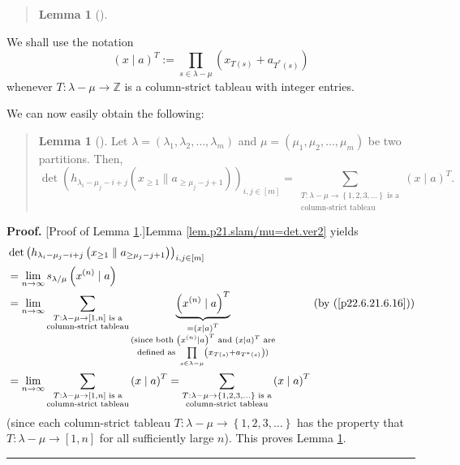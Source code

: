 \documentclass[numbers=enddot,12pt,final,onecolumn,notitlepage]{scrartcl}%
\newenvironment{statement}{\begin{quote}}{\end{quote}}
\theoremstyle{definition}
\newtheorem{lem}[theo]{Lemma}
\newenvironment{lemmain}[1][]
{\begin{statement}\begin{lem}[#1]}
{\end{lem}\end{statement}}
\newenvironment{proof}[1][Proof]{\noindent\textbf{#1.} }{\ \rule{0.5em}{0.5em}}
\newenvironment{lemmain}[1][Proof]{\noindent\textbf{#1.} }{\ \rule{0.5em}{0.5em}}
\let\sumnonlimits\sum
\let\prodnonlimits\prod
\renewcommand{\sum}{\sumnonlimits\limits}
\renewcommand{\prod}{\prodnonlimits\limits}
\begin{document}
\begin{enumerate}
\begin{lemmain}
\end{lemmain}

We shall use the notation%
\[
\left(  x\mid a\right)  ^{T}:=\prod_{s\in\lambda-\mu}\left(  x_{T\left(
s\right)  }+a_{T^{\ast}\left(  s\right)  }\right)
\]
whenever $T:\lambda-\mu\rightarrow\mathbb{Z}$ is a column-strict tableau with
integer entries.

We can now easily obtain the following:

\begin{lemmain}
\label{lem.p21.slam/mu=tab}Let $\lambda=\left(  \lambda_{1},\lambda_{2}%
,\ldots,\lambda_{m}\right)  $ and $\mu=\left(  \mu_{1},\mu_{2},\ldots,\mu
_{m}\right)  $ be two partitions. Then,%
\[
\det\left(  h_{\lambda_{i}-\mu_{j}-i+j}\left(  x_{\geq1}\parallel a_{\geq
\mu_{j}-j+1}\right)  \right)  _{i,j\in\left[  m\right]  }=\sum
_{\substack{T:\lambda-\mu\rightarrow\left\{  1,2,3,\ldots\right\}  \text{ is
a}\\\text{column-strict tableau}}}\left(  x\mid a\right)  ^{T}.
\]

\end{lemmain}

\begin{proof}
[Proof of Lemma \ref{lem.p21.slam/mu=tab}.]Lemma
\ref{lem.p21.slam/mu=det.ver2} yields%
\begin{align*}
&  \det\left(  h_{\lambda_{i}-\mu_{j}-i+j}\left(  x_{\geq1}\parallel
a_{\geq\mu_{j}-j+1}\right)  \right)  _{i,j\in\left[  m\right]  }\\
&  =\lim\limits_{n\rightarrow\infty}s_{\lambda/\mu}\left(  x^{\left(
n\right)  }\mid a\right) \\
&  =\lim\limits_{n\rightarrow\infty}\sum_{\substack{T:\lambda-\mu
\rightarrow\left[  1,n\right]  \text{ is a}\\\text{column-strict tableau}%
}}\underbrace{\left(  x^{\left(  n\right)  }\mid a\right)  ^{T}}%
_{\substack{=\left(  x\mid a\right)  ^{T}\\\text{(since both }\left(
x^{\left(  n\right)  }\mid a\right)  ^{T}\text{ and }\left(  x\mid a\right)
^{T}\text{ are}\\\text{defined as }\prod_{s\in\lambda-\mu}\left(  x_{T\left(
s\right)  }+a_{T^{\ast}\left(  s\right)  }\right)  \text{)}}%
}\ \ \ \ \ \ \ \ \ \ \left(  \text{by (\ref{p22.6.21.6.16})}\right) \\
&  =\lim\limits_{n\rightarrow\infty}\sum_{\substack{T:\lambda-\mu
\rightarrow\left[  1,n\right]  \text{ is a}\\\text{column-strict tableau}%
}}\left(  x\mid a\right)  ^{T}=\sum_{\substack{T:\lambda-\mu\rightarrow
\left\{  1,2,3,\ldots\right\}  \text{ is a}\\\text{column-strict tableau}%
}}\left(  x\mid a\right)  ^{T}%
\end{align*}
(since each column-strict tableau $T:\lambda-\mu\rightarrow\left\{
1,2,3,\ldots\right\}  $ has the property that $T:\lambda-\mu\rightarrow\left[
1,n\right]  $ for all sufficiently large $n$). This proves Lemma
\ref{lem.p21.slam/mu=tab}.
\end{proof}


\end{enumerate}
\end{document}
